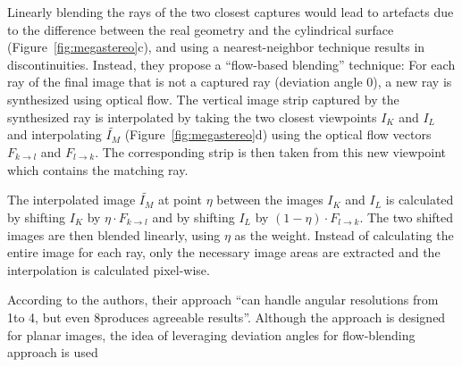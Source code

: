 Linearly blending the rays of the two closest captures would lead to artefacts due to the difference between the real geometry and the cylindrical surface (Figure~\ref{fig:megastereo}c), and using a nearest-neighbor technique results in discontinuities. Instead, they propose a ``flow-based blending'' technique: For each ray of the final image that is not a captured ray (deviation angle 0), a new ray is synthesized using optical flow. The vertical image strip captured by the synthesized ray is interpolated by taking the two closest viewpoints $I_K$ and $I_L$ and interpolating $\widetilde{I_M}$ (Figure~\ref{fig:megastereo}d) using the optical flow vectors $F_{k\rightarrow l}$ and $F_{l\rightarrow k}$.  The corresponding strip is then taken from this new viewpoint which contains the matching ray.



The interpolated image $\widetilde{I_M}$ at point $\eta$ between the images $I_K$ and $I_L$ is calculated by shifting $I_K$ by $\eta \cdot F_{k\rightarrow l}$ and by shifting $I_L$ by $(1 - \eta) \cdot F_{l\rightarrow k}$. The two shifted images are then blended linearly, using $\eta$ as the weight. Instead of calculating the entire image for each ray, only the necessary image areas are extracted and the interpolation is calculated pixel-wise.

According to the authors, their approach ``can handle angular resolutions from 1\degree to 4\degree, but even 8\degree produces agreeable results''. Although the approach is designed for planar images, the idea of leveraging deviation angles for  flow-blending approach is used 

